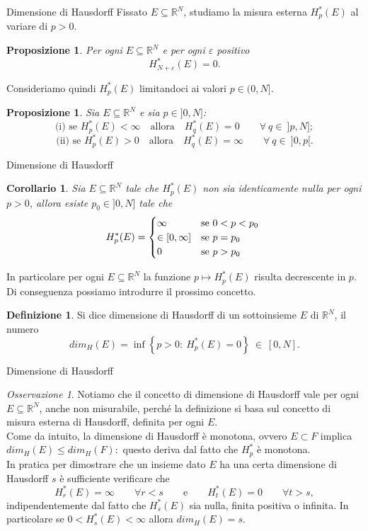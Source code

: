 \documentclass[intlimits]{beamer}
\numberwithin{equation}{section}
\theoremstyle{plain}
\newtheorem{prop}[teor]{Proposizione}
\newtheorem{cor}[teor]{Corollario}
\theoremstyle{definition}
\newtheorem{defin}[teor]{Definizione}
\theoremstyle{remark}
\newtheorem{oss}[teor]{Osservazione}
\newcommand{\gra}[1]{\left\{#1\right\}}
\renewcommand{\leq}{\leqslant}
\renewcommand{\epsilon}{\varepsilon}
\begin{document}
\begin{frame}{Dimensione di Hausdorff}
Fissato $E \subseteq \mathbb{R}^N$, studiamo la misura esterna $H^{*}_p(E)$ al variare di $p > 0$.
\pause
\begin{prop} Per ogni $E\subseteq \mathbb{R}^N$ e per ogni $\epsilon$ positivo 
\[H^{*}_{N+\epsilon}(E)=0.\] \end{prop} 
Consideriamo quindi $H^{*}_p(E)$ limitandoci ai valori $p \in (0,N]$.
\pause
\begin{prop} Sia $E\subseteq \mathbb{R}^N$ e sia $p \in ]0,N]$: \\
\[\text{(i) se } H^{*}_p(E) < \infty  \quad \text{allora} \quad H^{*}_q(E) = 0   \qquad  \forall\ q \in\ ]p,N]; \]  
\[\text{(ii) se } H^{*}_p(E) > 0  \quad \text{allora} \quad H^{*}_q(E) = \infty  \qquad  \forall\ q \in\ ]0,p[.\]\end{prop}
\end{frame}
\begin{frame}{Dimensione di Hausdorff}
\begin{cor} Sia $E\subseteq \mathbb{R}^N$ tale che $H^{*}_p(E)$ non sia identicamente nulla per ogni $p > 0$, allora 
esiste $p_0 \in ]0,N]$ tale che \\
\[ H^{*}_p(E) = \begin{cases}
    \infty & \text{se $0 < p < p_0$ }\\
    \in [0,\infty] & \text{se $p = p_0$ }\\
    0 & \text{se $ p > p_0  $}
\end{cases}\]
\end{cor}
In particolare per ogni $E\subseteq \mathbb{R}^N$ la funzione $p\longmapsto H^{*}_p(E)$ risulta decrescente in $p$.
Di conseguenza possiamo introdurre il prossimo concetto. \\
\pause
\begin{defin} Si dice dimensione di Hausdorff di un sottoinsieme $E$ di $\mathbb{R}^N$, il numero
\[dim_H(E) = \inf\gra{p > 0:\ H^{*}_p(E) = 0}\ \in\ [0,N].\]
\end{defin}
\end{frame}
\begin{frame}{Dimensione di Hausdorff}
\begin{oss} Notiamo che il concetto di dimensione di Hausdorff vale per ogni $E\subseteq \mathbb{R}^N$, 
anche non misurabile, perché la definizione si basa sul concetto di misura esterna di Hausdorff, 
definita per ogni $E$. \\
Come da intuito, la dimensione di Hausdorff è monotona, ovvero $E\subset F$ implica $dim_H(E)\leq dim_H(F):$
questo deriva dal fatto che $H^{*}_p$ è monotona.\\
\pause
In pratica per dimostrare che un insieme dato $E$ ha una certa dimensione di Hausdorff $s$ è sufficiente
verificare che 
\[H^{*}_r(E) = \infty \qquad \forall r < s  \qquad \text{e} \qquad H^{*}_t(E) = 0 \qquad \forall t > s,\]
indipendentemente dal fatto che $H^{*}_s(E)$ sia nulla, finita positiva o infinita.
In particolare se $0<H^{*}_s(E)<\infty$ allora $dim_H(E)=s.$\\
\end{oss}
\end{frame}
\end{document}

